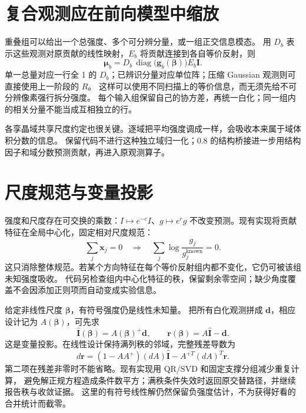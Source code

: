 \section{复合观测应在前向模型中缩放}

重叠组可以给出一个总强度、多个可分辨分量，或一组正交信息模态。
用 $D_b$ 表示这些观测对原贡献的线性映射，$E_b$ 将贡献连接到各自等价反射，则
\begin{equation}
 \bm\mu_b
 =D_b\,\operatorname{diag}\!\bigl(\bm g_b(\bm\beta)\bigr)E_b\bm I.
 \label{eq:scaling-composite}
\end{equation}
单一总量对应一行全 1 的 $D_b$；已辨识分量对应单位阵；压缩 Gaussian 观测则可直接使用上一阶段的 $R$。
这样可以使用不同扫描上的等价信息，而无须先给不可分辨像素强行拆分强度。
每个输入组保留自己的协方差，再统一白化；同一组内的相关分量不能当成互相独立的行。

各孪晶域共享尺度约定也很关键。逐域把平均强度调成一样，会吸收本来属于域体积分数的信息。
保留代码不进行这种独立域归一化；0.8 的结构桥接进一步用结构因子和域分数预测贡献，再进入原观测算子。

\section{尺度规范与变量投影}

强度和尺度存在可交换的乘数：$I\mapsto e^{-c}I$、$g\mapsto e^cg$
不改变预测。现有实现将贡献特征在全局中心化，固定相对尺度规范：
\begin{equation}
 \sum_j\bm x_j=0
 \quad\Longrightarrow\quad
 \sum_j\log\frac{g_j}{g_j^{\mathrm{known}}}=0.
 \label{eq:scaling-gauge}
\end{equation}
这只消除整体规范。若某个方向特征在每个等价反射组内都不变化，它仍可被该组未知强度吸收。
代码另检查组内中心化特征的秩，保留剩余零空间；缺少角度覆盖不会因添加正则项而自动变成实验信息。

给定非线性尺度 $\bm\beta$，有符号强度仍是线性未知量。
把所有白化观测拼成 $\bm d$，相应设计记为 $A(\bm\beta)$，可先求
\begin{equation}
 \widehat{\bm I}(\bm\beta)=A(\bm\beta)^+\bm d,
 \qquad
 \bm r(\bm\beta)=A\widehat{\bm I}-\bm d.
 \label{eq:scaling-varpro}
\end{equation}
这是变量投影\cite{golub1973}。在线性设计保持满列秩的邻域，完整残差导数为
\begin{equation}
 d\bm r=(1-AA^+)(dA)\widehat{\bm I}
          -A^{+T}(dA)^T\bm r.
 \label{eq:scaling-varpro-derivative}
\end{equation}
第二项在残差非零时不能省略。现有实现用 QR/SVD 和固定支撑分组减少重复计算，
避免解正规方程造成条件数平方；满秩条件失效时返回原交替路径，并继续报告秩与收敛证据。
这里的有符号线性解仍然保留负强度估计，不为获得好看的合并统计而截零。

